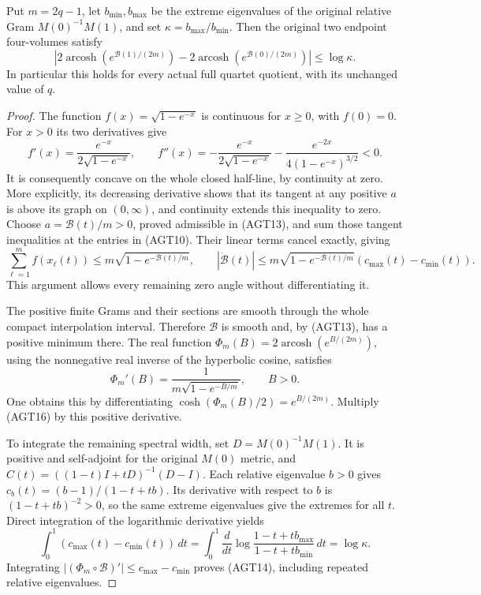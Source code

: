 \begin{theorem}
Put $m=2q-1$, let $b_{\min},b_{\max}$ be the extreme
eigenvalues of the original relative Gram
$M(0)^{-1}M(1)$, and set $\kappa=b_{\max}/b_{\min}$.
Then the original two endpoint four-volumes satisfy
\[
 \left|2\operatorname{arcosh}\!\left(e^{\mathcal B(1)/(2m)}\right)
       -2\operatorname{arcosh}\!\left(e^{\mathcal B(0)/(2m)}\right)
 \right|\le\log\kappa.
 \tag{AGT14}
\]
In particular this holds for every actual full quartet
quotient, with its unchanged value of $q$.
\end{theorem}
\begin{proof}
The function $f(x)=\sqrt{1-e^{-x}}$ is continuous for $x\ge0$,
with $f(0)=0$. For $x>0$ its two derivatives give
\[
 f'(x)=\frac{e^{-x}}{2\sqrt{1-e^{-x}}},\qquad
 f''(x)=-\frac{e^{-x}}{2\sqrt{1-e^{-x}}}
        -\frac{e^{-2x}}{4(1-e^{-x})^{3/2}}<0.
 \tag{AGT15}
\]
It is consequently concave on the whole closed half-line,
by continuity at zero. More explicitly, its decreasing
derivative shows that its tangent at any positive $a$ is
above its graph on $(0,\infty)$, and continuity extends
this inequality to zero. Choose
$a=\mathcal B(t)/m>0$, proved admissible in (AGT13), and
sum those tangent inequalities at the entries in (AGT10).
Their linear terms cancel exactly, giving
\[
 \sum_{\ell=1}^m f(x_\ell(t))
 \le m\sqrt{1-e^{-\mathcal B(t)/m}},\qquad
 |\dot{\mathcal B}(t)|
 \le m\sqrt{1-e^{-\mathcal B(t)/m}}
                 (c_{\max}(t)-c_{\min}(t)).
 \tag{AGT16}
\]
This argument allows every remaining zero angle without
differentiating it.

The positive finite Grams and their sections are smooth
through the whole compact interpolation interval. Therefore
$\mathcal B$ is smooth and, by (AGT13), has a positive
minimum there. The real function
$\Phi_m(B)=2\operatorname{arcosh}(e^{B/(2m)})$, using the
nonnegative real inverse of the hyperbolic cosine, satisfies
\[
 \Phi_m'(B)=\frac{1}{m\sqrt{1-e^{-B/m}}},\qquad B>0.
 \tag{AGT17}
\]
One obtains this by differentiating
$\cosh(\Phi_m(B)/2)=e^{B/(2m)}$. Multiply (AGT16) by
this positive derivative.

To integrate the remaining spectral width, set
$D=M(0)^{-1}M(1)$. It is positive and self-adjoint for the
original $M(0)$ metric, and
$C(t)=((1-t)I+tD)^{-1}(D-I)$. Each relative eigenvalue
$b>0$ gives $c_b(t)=(b-1)/(1-t+tb)$.
Its derivative with respect to $b$ is $(1-t+tb)^{-2}>0$,
so the same extreme eigenvalues give the extremes for all
$t$. Direct integration of the logarithmic derivative yields
\[
 \int_0^1(c_{\max}(t)-c_{\min}(t))\,dt
 =\int_0^1\frac{d}{dt}
      \log\frac{1-t+tb_{\max}}{1-t+tb_{\min}}\,dt
 =\log\kappa.
 \tag{AGT18}
\]
Integrating $|(\Phi_m\circ\mathcal B)'|\le c_{\max}-c_{\min}$
proves (AGT14), including repeated relative eigenvalues.
\end{proof}

